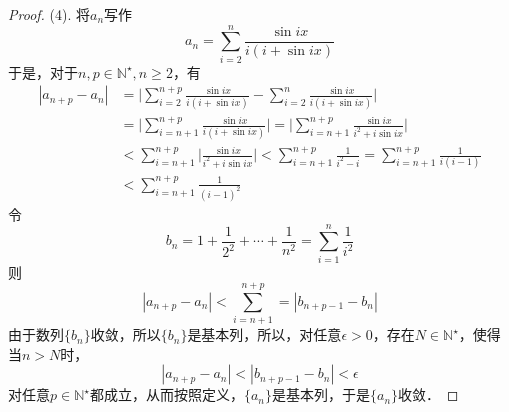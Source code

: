 \documentclass{ctexart}
\theoremstyle{definition}
\theoremstyle{definition}
\theoremstyle{plain}
\theoremstyle{plain}
\theoremstyle{plain}
\theoremstyle{definition}
\begin{document}
\begin{proof}
(4). 将$a_n$写作
\begin{equation}
    a_n = \sum_{i=2}^n \frac{\sin ix}{i(i+\sin ix)}
\end{equation}
于是，对于$n,p\in\mathbb{N}^\star, n \geq 2$，有
\begin{align}
    |a_{n+p}-a_n| &= \Bigg\lvert \sum_{i=2}^{n+p}\frac{\sin ix}{i(i+\sin ix)} - \sum_{i=2}^n \frac{\sin ix}{i(i+\sin ix)} \Bigg\rvert \\
    &= \Bigg\lvert \sum_{i=n+1}^{n+p} \frac{\sin ix}{i(i+\sin ix)} \Bigg\rvert = \Bigg\lvert \sum_{i=n+1}^{n+p} \frac{\sin ix}{i^2 + i \sin ix} \Bigg\rvert \\
    &< \sum_{i=n+1}^{n+p} \bigg\lvert \frac{\sin ix}{i^2 + i \sin ix} \bigg\rvert < \sum_{i=n+1}^{n+p}\frac{1}{i^2-i}  = \sum_{i=n+1}^{n+p} \frac{1}{i(i-1)} \\
    &< \sum_{i=n+1}^{n+p}\frac{1}{(i-1)^2}
\end{align}
令
\begin{equation}
    b_n = 1+\frac{1}{2^2}+\cdots+\frac{1}{n^2}=\sum_{i=1}^n\frac{1}{i^2}
\end{equation}
则
\begin{equation}
    |a_{n+p}-a_n|<\sum_{i=n+1}^{n+p} = |b_{n+p-1}-b_{n}|
\end{equation}
由于数列$\{b_n\}$收敛，所以$\{b_n\}$是基本列，所以，对任意$\epsilon>0$，存在$N\in\mathbb{N}^\star$，使得当$n>N$时，
\begin{equation}
    |a_{n+p}-a_n|<|b_{n+p-1}-b_n|<\epsilon
\end{equation}
对任意$p\in\mathbb{N}^\star$都成立，从而按照定义，$\{a_n\}$是基本列，于是$\{a_n\}$收敛．
\end{proof}
\end{document}
